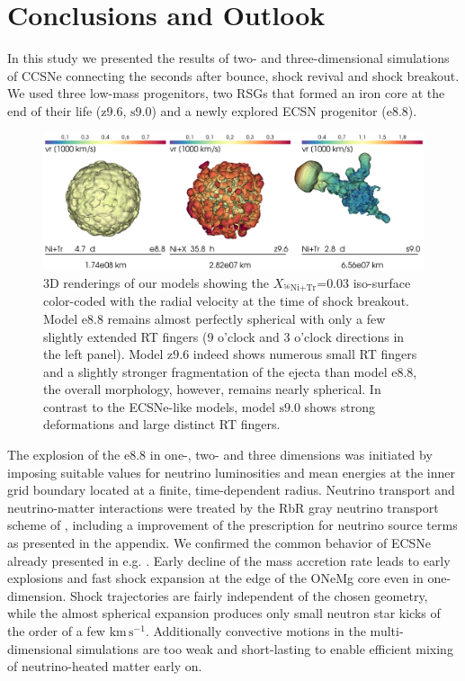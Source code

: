 \documentclass[fleqn,usenatbib]{mnras}
\newcommand{\nickel}{\ensuremath{\mathrm{^{56}Ni}}\xspace}
\newcommand{\tracer}{\ensuremath{\mathrm{Tr}}\xspace}
\newcommand{\kms}{\ensuremath{\mathrm{km\, s^{-1}}}}
\newcommand{\onemg}{\ensuremath{\mathrm{e8.8}}\xspace}
\newcommand{\snine}{\ensuremath{\mathrm{s9.0}}\xspace}
\newcommand{\znine}{\ensuremath{\mathrm{z9.6}}\xspace}
\begin{document}
\section{Conclusions and Outlook}
In this study we presented the results of two- and three-dimensional
 simulations of CCSNe connecting the seconds after bounce, shock 
 revival and shock breakout. We used three low-mass progenitors, 
 two RSGs that formed an iron core at the end of their life 
 (\znine, \snine) and a newly explored ECSN progenitor (\onemg). 

\begin{figure}%
 \centering
 \includegraphics[width=\textwidth,trim=0cm 0.0cm 0cm 0cm,clip]{pic/visit_models.png}
 \caption{3D renderings of our models showing the $X_{\nickel\mathord{+}\tracer}\mathord{=}0.03$ iso-surface color-coded with the radial velocity at the time of shock breakout. Model \onemg remains almost perfectly spherical with only a few slightly extended RT fingers (9 o'clock and 3 o'clock directions in the left panel). Model \znine indeed shows numerous small RT fingers and a slightly stronger fragmentation of the ejecta than model \onemg, the overall morphology, however, remains nearly spherical. In contrast to the ECSNe-like models, model \snine shows strong deformations and large distinct RT fingers. 
 }
 \label{fig:all 3d models visit}
\end{figure}%

The explosion of the \onemg in one-, two- and three dimensions 
was initiated by imposing suitable values for neutrino luminosities 
and mean energies at the inner grid boundary located at a finite, 
time-dependent radius. Neutrino transport and neutrino-matter interactions 
were treated by the RbR gray neutrino transport scheme of \citet{Scheck2006}, 
including a improvement of the prescription for neutrino source 
terms as presented in the appendix. We confirmed the common behavior of 
ECSNe already presented in e.g. \citet{Kitaura2006,Gessner2018}. 
Early decline of the mass accretion rate leads to early explosions and 
fast shock expansion at the edge of the ONeMg core even in one-dimension. 
Shock trajectories are fairly independent of the chosen geometry, 
while the almost spherical expansion produces only small neutron 
star kicks of the order of a few \kms. Additionally convective 
motions in the multi-dimensional simulations are too weak and 
short-lasting to enable efficient mixing of neutrino-heated matter early on.
\end{document}
